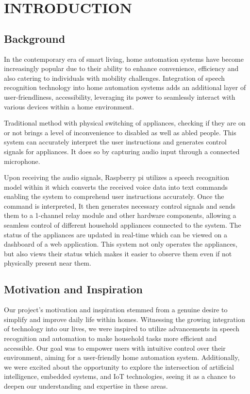 \setcounter{page}{1}
\chapter{INTRODUCTION}
    \section{Background}
    In the contemporary era of smart living, home automation systems have become increasingly popular due to their ability to enhance convenience, efficiency and also catering to individuals with mobility challenges. Integration of speech recognition technology into home automation systems adds an additional layer of user-friendliness, accessibility, leveraging its power to seamlessly interact with various devices within a home environment.

    Traditional method with physical switching of appliances, checking if they are on or not brings a level of inconvenience to disabled as well as abled people. This system can accurately interpret the user instructions and generates control signals for appliances. It does so by capturing audio input through a connected microphone.

    Upon receiving the audio signals, Raspberry pi utilizes a speech recognition model within it which converts the received voice data into text commands enabling the system to comprehend user instructions accurately. Once the command is interpreted, It then generates necessary control signals and sends them to a 1-channel relay module and other hardware components, allowing a seamless control of different household appliances connected to the system. The status of the appliances are updated in real-time which can be viewed on a dashboard of a web application. This system not only operates the appliances, but also views their status which makes it easier to observe them  even if  not physically present near them.

    \section{Motivation and Inspiration}
    Our project's motivation and inspiration stemmed from a genuine desire to simplify and improve daily life within homes. Witnessing the growing integration of technology into our lives, we were inspired to utilize advancements in speech recognition and automation to make household tasks more efficient and accessible. Our goal was to empower users with intuitive control over their environment, aiming for a user-friendly home automation system. Additionally, we were excited about the opportunity to explore the intersection of artificial intelligence, embedded systems, and IoT technologies, seeing it as a chance to deepen our understanding and expertise in these areas. 
    
